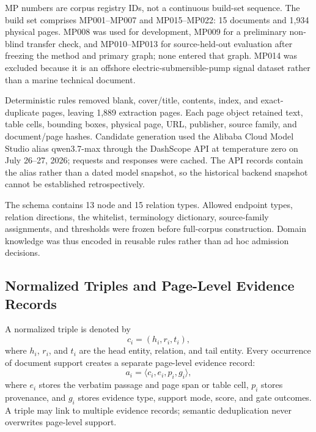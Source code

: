 \documentclass[conference,a4paper]{IEEEtran}
\begin{document}
MP numbers are corpus registry IDs, not a continuous build-set sequence. The build set comprises MP001--MP007 and MP015--MP022: 15 documents and 1,934 physical pages. MP008 was used for development, MP009 for a preliminary non-blind transfer check, and MP010--MP013 for source-held-out evaluation after freezing the method and primary graph; none entered that graph. MP014 was excluded because it is an offshore electric-submersible-pump signal dataset rather than a marine technical document.

Deterministic rules removed blank, cover/title, contents, index, and exact-duplicate pages, leaving 1,889 extraction pages. Each page object retained text, table cells, bounding boxes, physical page, URL, publisher, source family, and document/page hashes. Candidate generation used the Alibaba Cloud Model Studio alias \mbox{qwen3.7-max} through the DashScope API at temperature zero on July 26--27, 2026; requests and responses were cached. The API records contain the alias rather than a dated model snapshot, so the historical backend snapshot cannot be established retrospectively.

The schema contains 13 node and 15 relation types. Allowed endpoint types, relation directions, the whitelist, terminology dictionary, source-family assignments, and thresholds were frozen before full-corpus construction. Domain knowledge was thus encoded in reusable rules rather than ad hoc admission decisions.

\subsection{Normalized Triples and Page-Level Evidence Records}

A normalized triple is denoted by
\begin{equation}
c_i=(h_i,r_i,t_i),
\label{eq:triple}
\end{equation}
where $h_i$, $r_i$, and $t_i$ are the head entity, relation, and tail entity. Every occurrence of document support creates a separate page-level evidence record:
\begin{equation}
a_i=\langle c_i,e_i,p_i,g_i\rangle,
\label{eq:evidence}
\end{equation}
where $e_i$ stores the verbatim passage and page span or table cell, $p_i$ stores provenance, and $g_i$ stores evidence type, support mode, score, and gate outcomes. A triple may link to multiple evidence records; semantic deduplication never overwrites page-level support.
\end{document}
